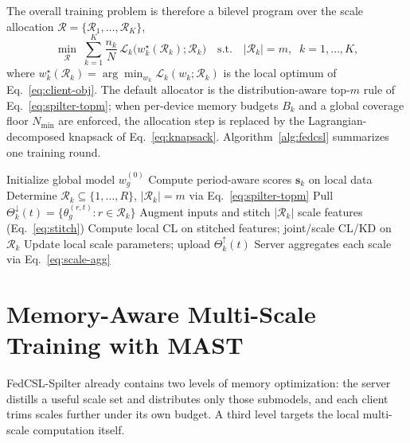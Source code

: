 \documentclass[sigconf]{acmart}
\begin{document}
The overall training problem is therefore a bilevel program over the scale
allocation $\mathcal{R}=\{\mathcal{R}_1,\dots,\mathcal{R}_K\}$,
\begin{equation}
\min_{\mathcal{R}}\;\sum_{k=1}^{K}\frac{n_k}{N}\,
\mathcal{L}_k\!\bigl(w_k^{\star}(\mathcal{R}_k);\mathcal{R}_k\bigr)
\quad\text{s.t.}\quad
|\mathcal{R}_k|=m,\;\;k=1,\dots,K,
\label{eq:overall-obj}
\end{equation}
where $w_k^{\star}(\mathcal{R}_k)=\arg\min_{w_k}\mathcal{L}_k(w_k;\mathcal{R}_k)$
is the local optimum of Eq.~\eqref{eq:client-obj}. The default allocator is the
distribution-aware top-$m$ rule of Eq.~\eqref{eq:spilter-topm}; when per-device
memory budgets $B_k$ and a global coverage floor $N_{\min}$ are enforced, the
allocation step is replaced by the Lagrangian-decomposed knapsack of
Eq.~\eqref{eq:knapsack}. Algorithm~\ref{alg:fedcsl} summarizes one training
round.

\begin{algorithm}[t]
\caption{FedCSL-Spilter training procedure}
\label{alg:fedcsl}
\begin{algorithmic}[1]
\State Initialize global model $w_g^{(0)}$
    \State Compute period-aware scores $\mathbf{s}_k$ on local data
    \State Determine $\mathcal{R}_k\subseteq\{1,\dots,R\}$, $|\mathcal{R}_k|=m$
           via Eq.~\eqref{eq:spilter-topm}
\EndFor
{}
        \State Pull $\Theta_k^{\downarrow}(t)=\{\theta_g^{(r,t)}:r\in\mathcal{R}_k\}$
        \State Augment inputs and stitch $|\mathcal{R}_k|$ scale features
               (Eq.~\eqref{eq:stitch})
        \State Compute local CL on stitched features; joint/scale CL/KD on
               $\mathcal{R}_k$
        \State Update local scale parameters; upload $\Theta_k^{\uparrow}(t)$
    \EndFor
    \State Server aggregates each scale via Eq.~\eqref{eq:scale-agg}
\EndFor
\end{algorithmic}
\end{algorithm}

\section{Memory-Aware Multi-Scale Training with MAST}
\label{sec:mast}

FedCSL-Spilter already contains two levels of memory optimization: the server
distills a useful scale set and distributes only those submodels, and each client
trims scales further under its own budget. A third level targets the local
multi-scale computation itself.
\end{document}
